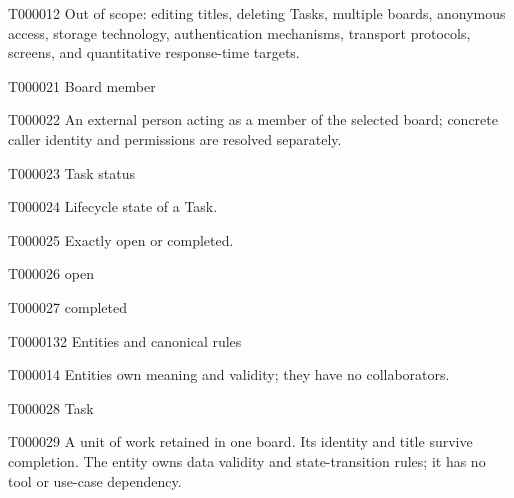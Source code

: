 \documentclass[11pt,a4paper]{article}
\begin{document}
\begin{atlasparagraph}{T000012}
Out of scope: editing titles, deleting Tasks, multiple boards, anonymous access, storage technology, authentication mechanisms, transport protocols, screens, and quantitative response-time targets.
\end{atlasparagraph}
\begin{atlastext}{T000021}
Board member
\end{atlastext}
\begin{atlasparagraph}{T000022}
An external person acting as a member of the selected board; concrete caller identity and permissions are resolved separately.
\end{atlasparagraph}
\begin{atlastext}{T000023}
Task status
\end{atlastext}
\begin{atlasparagraph}{T000024}
Lifecycle state of a Task.
\end{atlasparagraph}
\begin{atlasparagraph}{T000025}
Exactly open or completed.
\end{atlasparagraph}
\begin{atlasitem}{T000026}
open
\end{atlasitem}
\begin{atlasitem}{T000027}
completed
\end{atlasitem}
\begin{atlasheading}{T000013}{2}
Entities and canonical rules
\end{atlasheading}
\begin{atlasparagraph}{T000014}
Entities own meaning and validity; they have no collaborators.
\end{atlasparagraph}
\begin{atlastext}{T000028}
Task
\end{atlastext}
\begin{atlasparagraph}{T000029}
A unit of work retained in one board. Its identity and title survive completion. The entity owns data validity and state-transition rules; it has no tool or use-case dependency.
\end{atlasparagraph}
\end{document}
